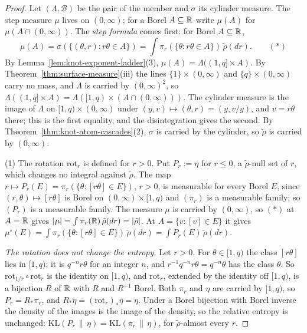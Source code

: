 \begin{proof}
Let $(\Lambda, \mathcal{B})$ be the pair of the member and $\sigma$ its cylinder measure. The step
measure $\mu$ lives on $(0,\infty)$; for a Borel $A \subseteq \mathbb{R}$ write $\mu(A)$ for
$\mu(A \cap (0,\infty))$. The \emph{step formula} comes first: for Borel $A \subseteq \mathbb{R}$,
\[
  \mu(A) = \sigma(\{(\theta, r) : r\theta \in A\}) = \int\pi_r(\{\theta : r\theta \in A\})\,\tilde\rho(dr).
  \qquad (*)
\]
By Lemma~\ref{lem:knot-exponent-ladder}(3), $\mu(A) = \Lambda((1,q] \times A)$. By
Theorem~\ref{thm:surface-measure}(iii) the lines $\{1\} \times (0,\infty)$ and
$\{q\} \times (0,\infty)$ carry no mass, and $\Lambda$ is carried by $(0,\infty)^2$, so
$\Lambda((1,q] \times A) = \Lambda([1,q) \times (A \cap (0,\infty)))$. The cylinder measure is the
image of $\Lambda$ on $[1,q) \times (0,\infty)$ under $(y, v) \mapsto (\theta, r) = (y, v/y)$, and
$v = r\theta$ there; this is the first equality, and the disintegration gives the second. By
Theorem~\ref{thm:knot-atom-cascades}(2), $\sigma$ is carried by the cylinder, so $\tilde\rho$ is
carried by $(0,\infty)$.

(1) The rotation $\mathrm{rot}_r$ is defined for $r > 0$. Put $P_r := \eta$ for $r \le 0$, a
$\tilde\rho$-null set of $r$, which changes no integral against $\tilde\rho$. The map
$r \mapsto P_r(E) = \pi_r(\{\theta : [r\theta] \in E\})$, $r > 0$, is measurable for every Borel
$E$, since $(r, \theta) \mapsto [r\theta]$ is Borel on $(0,\infty) \times [1,q)$ and $(\pi_r)$ is a
measurable family; so $(P_r)$ is a measurable family. The measure $\mu$ is carried by $(0,\infty)$,
so $(*)$ at $A = \mathbb{R}$ gives $|\mu| = \int\pi_r(\mathbb{R})\,\tilde\rho(dr) = |\tilde\rho|$. At
$A = \{v : [v] \in E\}$ it gives
$\mu^\circ(E) = \int\pi_r(\{\theta : [r\theta] \in E\})\,\tilde\rho(dr) = \int P_r(E)\,\tilde\rho(dr)$.

\emph{The rotation does not change the entropy.} Let $r > 0$. For $\theta \in [1,q)$ the class
$[r\theta]$ lies in $[1,q)$; it is $q^{-n}r\theta$ for an integer $n$, and $r^{-1}q^{-n}r\theta = q^{-n}\theta$
has the class $\theta$. So $\mathrm{rot}_{1/r} \circ \mathrm{rot}_r$ is the identity on $[1,q)$,
and $\mathrm{rot}_r$, extended by the identity off $[1,q)$, is a bijection $R$ of $\mathbb{R}$ with $R$ and
$R^{-1}$ Borel. Both $\pi_r$ and $\eta$ are carried by $[1,q)$, so $P_r = R_*\pi_r$, and
$R_*\eta = (\mathrm{rot}_r)_*\eta = \eta$. Under a Borel bijection with Borel inverse the density
of the images is the image of the density, so the relative entropy is unchanged:
$\mathrm{KL}(P_r \,\|\, \eta) = \mathrm{KL}(\pi_r \,\|\, \eta)$, for $\tilde\rho$-almost every $r$.


\end{proof}
